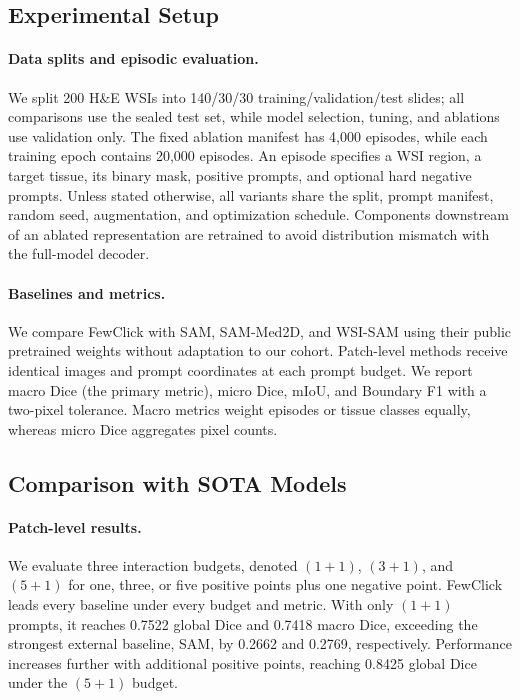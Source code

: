 \documentclass[letterpaper]{article}
\begin{document}

\subsection{Experimental Setup}
\paragraph{Data splits and episodic evaluation.}
We split 200 H\&E WSIs into 140/30/30 training/validation/test slides; all comparisons use the sealed test set, while model selection, tuning, and ablations use validation only. The fixed ablation manifest has 4,000 episodes, while each training epoch contains 20,000 episodes. An episode specifies a WSI region, a target tissue, its binary mask, positive prompts, and optional hard negative prompts. Unless stated otherwise, all variants share the split, prompt manifest, random seed, augmentation, and optimization schedule. Components downstream of an ablated representation are retrained to avoid distribution mismatch with the full-model decoder.

\paragraph{Baselines and metrics.}
We compare FewClick with SAM, SAM-Med2D, and WSI-SAM using their public pretrained weights without adaptation to our cohort. Patch-level methods receive identical images and prompt coordinates at each prompt budget. We report macro Dice (the primary metric), micro Dice, mIoU, and Boundary F1 with a two-pixel tolerance. Macro metrics weight episodes or tissue classes equally, whereas micro Dice aggregates pixel counts.

\subsection{Comparison with SOTA Models}
\paragraph{Patch-level results.}
We evaluate three interaction budgets, denoted $(1{+}1)$, $(3{+}1)$, and $(5{+}1)$ for one, three, or five positive points plus one negative point. FewClick leads every baseline under every budget and metric. With only $(1{+}1)$ prompts, it reaches 0.7522 global Dice and 0.7418 macro Dice, exceeding the strongest external baseline, SAM, by 0.2662 and 0.2769, respectively. Performance increases further with additional positive points, reaching 0.8425 global Dice under the $(5{+}1)$ budget.
\end{document}
